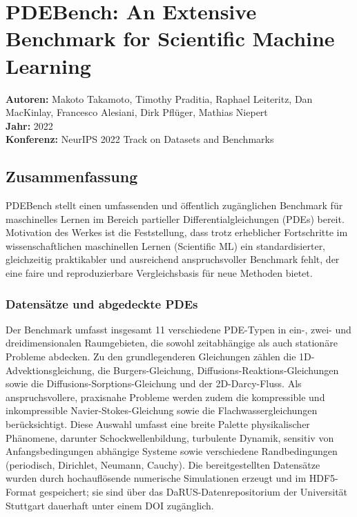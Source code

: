 \documentclass[a4paper,12pt]{article}
\begin{document}
\section*{PDEBench: An Extensive Benchmark for Scientific Machine Learning}

\textbf{Autoren:} Makoto Takamoto, Timothy Praditia, Raphael Leiteritz, Dan MacKinlay,
Francesco Alesiani, Dirk Pflüger, Mathias Niepert \\
\textbf{Jahr:} 2022 \\
\textbf{Konferenz:} NeurIPS 2022 Track on Datasets and Benchmarks

\subsection*{Zusammenfassung}

PDEBench stellt einen umfassenden und öffentlich zugänglichen Benchmark für maschinelles
Lernen im Bereich partieller Differentialgleichungen (PDEs) bereit. Motivation des Werkes
ist die Feststellung, dass trotz erheblicher Fortschritte im wissenschaftlichen maschinellen
Lernen (Scientific ML) ein standardisierter, gleichzeitig praktikabler und ausreichend
anspruchsvoller Benchmark fehlt, der eine faire und reproduzierbare Vergleichsbasis für
neue Methoden bietet.

\subsubsection*{Datensätze und abgedeckte PDEs}

Der Benchmark umfasst insgesamt 11 verschiedene PDE-Typen in ein-, zwei- und
dreidimensionalen Raumgebieten, die sowohl zeitabhängige als auch stationäre Probleme
abdecken. Zu den grundlegenderen Gleichungen zählen die 1D-Advektionsgleichung, die
Burgers-Gleichung, Diffusions-Reaktions-Gleichungen sowie die Diffusions-Sorptions-Gleichung
und der 2D-Darcy-Fluss. Als anspruchsvollere, praxisnahe Probleme werden zudem die
kompressible und inkompressible Navier-Stokes-Gleichung sowie die Flachwassergleichungen
berücksichtigt. Diese Auswahl umfasst eine breite Palette physikalischer Phänomene,
darunter Schockwellenbildung, turbulente Dynamik, sensitiv von Anfangsbedingungen
abhängige Systeme sowie verschiedene Randbedingungen (periodisch, Dirichlet, Neumann,
Cauchy). Die bereitgestellten Datensätze wurden durch hochauflösende numerische Simulationen
erzeugt und im HDF5-Format gespeichert; sie sind über das DaRUS-Datenrepositorium der
Universität Stuttgart dauerhaft unter einem DOI zugänglich.
\end{document}
